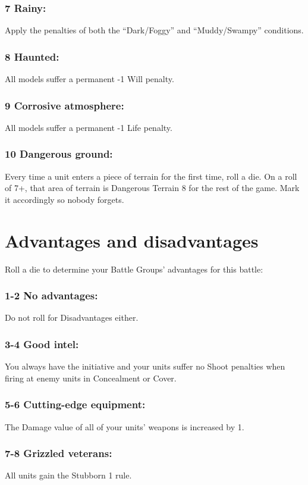 \begin{multicols}{2}
\subsubsection*{7 Rainy:} Apply the penalties of both the ``Dark/Foggy'' and ``Muddy/Swampy'' conditions.

\subsubsection*{8 Haunted:} All models suffer a permanent -1 Will penalty.

\subsubsection*{9 Corrosive atmosphere:} All models suffer a permanent -1 Life penalty.

\subsubsection*{10 Dangerous ground:} Every time a unit enters a piece of terrain for the first time, roll a die. On a roll of 7+, that area of terrain is Dangerous Terrain 8 for the rest of the game. Mark it accordingly so nobody forgets.




\section*{Advantages and disadvantages}
Roll a die to determine your Battle Groups' advantages for this battle:
\subsubsection*{1-2 No advantages:} Do not roll for Disadvantages either.

\subsubsection*{3-4 Good intel:} You always have the initiative and your units suffer no Shoot penalties when firing at enemy units in Concealment or Cover.

\subsubsection*{5-6 Cutting-edge equipment:} The Damage value of all of your units' weapons is increased by 1.

\subsubsection*{7-8 Grizzled veterans:} All units gain the Stubborn 1 rule.


\end{multicols}
